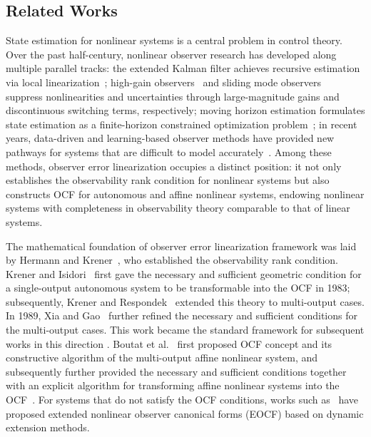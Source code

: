 \documentclass[11pt]{article}
\begin{document}
\subsection{Related Works}

State estimation for nonlinear systems is a central problem in control theory. Over the past half-century, nonlinear observer research has developed along multiple parallel tracks: the extended Kalman filter achieves recursive estimation via local linearization~\cite{gelb1974,10264154}; high-gain observers~\cite{khalil2017,Li2025PrescribedTime,Farza2025SATFHGO,10497867} and sliding mode observers~\cite{slotine1987,spurgeon2008,edwards1998,9536496} suppress nonlinearities and uncertainties through large-magnitude gains and discontinuous switching terms, respectively; moving horizon estimation formulates state estimation as a finite-horizon constrained optimization problem~\cite{rao2003,10453955,Xie2024BackAndForth}; in recent years, data-driven and learning-based observer methods have provided new pathways for systems that are difficult to model accurately~\cite{tang2024,Marani2025DeepLearningKKL,Zhou2024HealthStatus}. Among these methods, observer error linearization occupies a distinct position: it not only establishes the observability rank condition for nonlinear systems but also constructs OCF for autonomous and affine nonlinear systems, endowing nonlinear systems with completeness in observability theory comparable to that of linear systems.

The mathematical foundation of observer error linearization framework was laid by Hermann and Krener~\cite{Hermann1977}, who established the observability rank condition. Krener and Isidori~\cite{Krener1983} first gave the necessary and sufficient geometric condition for a single-output autonomous system to be transformable into the OCF in 1983; subsequently, Krener and Respondek~\cite{Krener1985} extended this theory to multi-output cases. In 1989, Xia and Gao~\cite{Xia1989} further refined the necessary and sufficient conditions for the multi-output cases. This work became the standard framework for subsequent works in this direction \cite{Hou1999,Phelps1992}. Boutat et al.~\cite{Boutat2006CDC} first proposed OCF concept and its constructive algorithm of the multi-output affine nonlinear system, and subsequently further provided the necessary and sufficient conditions together with an explicit algorithm for transforming affine nonlinear systems into the OCF~\cite{Boutat2009Automatica}. For systems that do not satisfy the OCF conditions, works such as~\cite{Boutat2011IJC,Tami2013Automatica,Boutat2015} have proposed extended nonlinear observer canonical forms (EOCF) based on dynamic extension methods.
\end{document}
